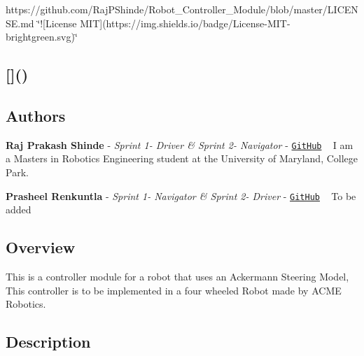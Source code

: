 \href{https://travis-ci.org/RajPShinde/Robot_Controller_Module}{\tt } \href{https://coveralls.io/github/RajPShinde/Robot_Controller_Module?branch=master}{\tt } https\+://github.com/\+Raj\+P\+Shinde/\+Robot\+\_\+\+Controller\+\_\+\+Module/blob/master/\+L\+I\+C\+E\+N\+S\+E.\+md \char`\"{}!\mbox{[}\+License M\+I\+T\mbox{]}(https\+://img.\+shields.\+io/badge/\+License-\/\+M\+I\+T-\/brightgreen.\+svg)\char`\"{} \subsection*{\mbox{[}\mbox{]}() }

\subsection*{Authors}


\begin{DoxyItemize}
\item {\bfseries Raj Prakash Shinde} -\/ {\itshape Sprint 1-\/ Driver \& Sprint 2-\/ Navigator} -\/ \href{https://github.com/RajPShinde}{\tt Git\+Hub} ~\newline
I am a Masters in Robotics Engineering student at the University of Maryland, College Park.
\item {\bfseries Prasheel Renkuntla} -\/ {\itshape Sprint 1-\/ Navigator \& Sprint 2-\/ Driver} -\/ \href{https://github.com/Prasheel24}{\tt Git\+Hub} ~\newline
To be added
\end{DoxyItemize}

\subsection*{Overview}

This is a controller module for a robot that uses an Ackermann Steering Model, This controller is to be implemented in a four wheeled Robot made by A\+C\+ME Robotics.

\subsection*{Description}

